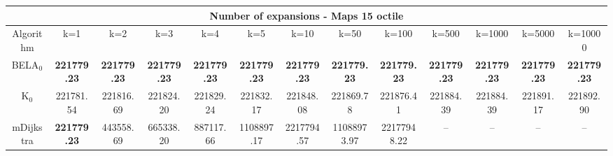 \begin{tabular}{c|cccccccccccc}\toprule
\multicolumn{13}{c}{Number of expansions - Maps 15 octile}\\ \midrule
Algorithm & k=1 & k=2 & k=3 & k=4 & k=5 & k=10 & k=50 & k=100 & k=500 & k=1000 & k=5000 & k=10000 \\ \midrule
BELA$_0$ & \textbf{221779.23} & \textbf{221779.23} & \textbf{221779.23} & \textbf{221779.23} & \textbf{221779.23} & \textbf{221779.23} & \textbf{221779.23} & \textbf{221779.23} & \textbf{221779.23} & \textbf{221779.23} & \textbf{221779.23} & \textbf{221779.23} \\
K$_0$ & 221781.54 & 221816.69 & 221824.20 & 221829.24 & 221832.17 & 221848.08 & 221869.78 & 221876.41 & 221884.39 & 221884.39 & 221891.17 & 221892.90 \\
mDijkstra & \textbf{221779.23} & 443558.69 & 665338.20 & 887117.66 & 1108897.17 & 2217794.57 & 11088973.97 & 22177948.22 & -- & -- & -- & -- \\ \bottomrule 
\end{tabular}
